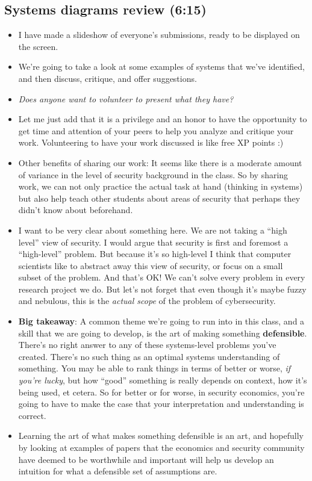 \documentclass[11pt]{article}
\begin{document}
\subsection{Systems diagrams review (6:15)}

\begin{itemize}
    \item I have made a slideshow of everyone's submissions, ready to be displayed on the screen. 
    \item We're going to take a look at some examples of systems that we've identified, and then discuss, critique, and offer suggestions.
    \item {\it Does anyone want to volunteer to present what they have?}
    \item Let me just add that it is a privilege and an honor to have the opportunity to get time and attention of your peers to help you analyze and critique your work. Volunteering to have your work discussed is like free XP points :) 
    \item Other benefits of sharing our work: It seems like there is a moderate amount of variance in the level of security background in the class. So by sharing work, we can not only practice the actual task at hand (thinking in systems) but also help teach other students about areas of security that perhaps they didn't know about beforehand.
    \item I want to be very clear about something here. We are not taking a ``high level'' view of security. I would argue that security is first and foremost a ``high-level'' problem. But because it's so high-level I think that computer scientists like to abstract away this view of security, or focus on a small subset of the problem. And that's OK! We can't solve every problem in every research project we do. But let's not forget that even though it's maybe fuzzy and nebulous, this is the {\it actual scope} of the problem of cybersecurity. 
    \item {\bf Big takeaway}: A common theme we're going to run into in this class, and a skill that we are going to develop, is the art of making something {\bf defensible}. There's no right answer to any of these systems-level problems you've created. There's no such thing as an optimal systems understanding of something. You may be able to rank things in terms of better or worse, {\it if you're lucky}, but how ``good'' something is really depends on context, how it's being used, et cetera. So for better or for worse, in security economics, you're going to have to make the case that your interpretation and understanding is correct. 
    \item Learning the art of what makes something defensible is an art, and hopefully by looking at examples of papers that the economics and security community have deemed to be worthwhile and important will help us develop an intuition for what a defensible set of assumptions are. 
\end{itemize}
\end{document}
